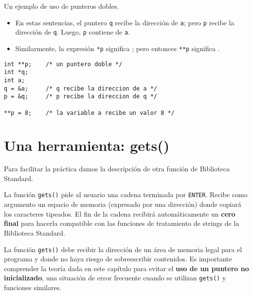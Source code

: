 \begin{ejemplo}
Un ejemplo de uso de punteros dobles. 
\begin{itemize}
	\item En estas sentencias, el puntero \lstinline{q} recibe la dirección de \lstinline{a}; pero \lstinline{p} recibe la dirección de \lstinline{q}. Luego, \lstinline{p} contiene  de \lstinline{a}. 
	\item Similarmente, la expresión \lstinline{*p} significa ; pero entonces \lstinline{**p} significa .
\end{itemize}
\begin{lstlisting}
int **p;    /* un puntero doble */
int *q;
int a;
q = &a;		/* q recibe la direccion de a */
p = &q;		/* p recibe la direccion de q */
			
**p = 8;    /* la variable a recibe un valor 8 */
\end{lstlisting}
\end{ejemplo}

\section{Una herramienta: gets()}
\label{sec:lafunciongets}

Para facilitar la práctica damos la descripción de otra función de Biblioteca
Standard.

La función \lstinline{gets()} pide al usuario una cadena terminada por \lstinline{ENTER}. Recibe como
argumento un espacio de memoria (expresado por una dirección) donde copiará los
caracteres tipeados. El fin de la cadena recibirá automáticamente un \textbf{cero final} para hacerla compatible con
las funciones de tratamiento de strings de la Biblioteca Standard.

La función \lstinline{gets()} debe recibir la dirección de un área
de memoria legal para el programa y donde no haya riesgo de sobreescribir
contenidos. Es importante comprender la teoría dada en este capítulo para
evitar el \textbf{uso de un puntero no inicializado}, una situación de error frecuente 
cuando se utilizan \lstinline{gets()} y funciones similares. 


